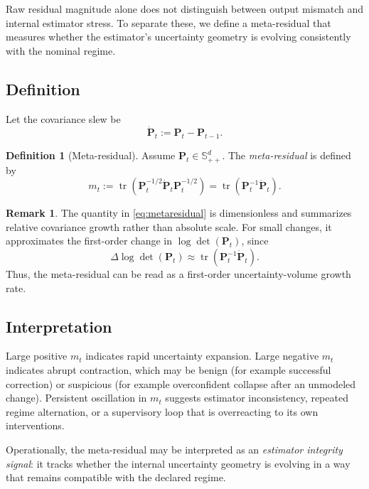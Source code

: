 \documentclass[11pt,letterpaper]{article}
\newcommand{\covar}{\mathbf{P}}
\newcommand{\metares}{m}
\newcommand{\trace}{\operatorname{tr}}
\theoremstyle{gcresult}
\theoremstyle{definition}
\newtheorem{definition}[theorem]{Definition}
\newtheorem{remark}[theorem]{Remark}
\begin{document}
Raw residual magnitude alone does not distinguish between output mismatch and internal estimator stress. To separate these, we define a meta-residual that measures whether the estimator's uncertainty geometry is evolving consistently with the nominal regime.

\subsection{Definition}
Let the covariance slew be
\begin{equation}
    \dot{\covar}_t := \covar_t - \covar_{t-1}.
\end{equation}

\begin{definition}[Meta-residual]
Assume $\covar_t \in \mathbb{S}_{++}^d$. The \emph{meta-residual} is defined by
\begin{equation}
    \metares_t := \trace\!\left(\covar_t^{-1/2} \dot{\covar}_t \covar_t^{-1/2}\right)
    = \trace(\covar_t^{-1}\dot{\covar}_t).
    \label{eq:metaresidual}
\end{equation}
\end{definition}

\begin{remark}
The quantity in \cref{eq:metaresidual} is dimensionless and summarizes relative covariance growth rather than absolute scale. For small changes, it approximates the first-order change in $\log \det(\covar_t)$, since
\begin{equation}
    \Delta \log\det(\covar_t) \approx \trace(\covar_t^{-1}\dot{\covar}_t).
\end{equation}
Thus, the meta-residual can be read as a first-order uncertainty-volume growth rate.
\end{remark}

\subsection{Interpretation}
Large positive $\metares_t$ indicates rapid uncertainty expansion. Large negative $\metares_t$ indicates abrupt contraction, which may be benign (for example successful correction) or suspicious (for example overconfident collapse after an unmodeled change). Persistent oscillation in $\metares_t$ suggests estimator inconsistency, repeated regime alternation, or a supervisory loop that is overreacting to its own interventions.

Operationally, the meta-residual may be interpreted as an \emph{estimator integrity signal}: it tracks whether the internal uncertainty geometry is evolving in a way that remains compatible with the declared regime.
\end{document}
